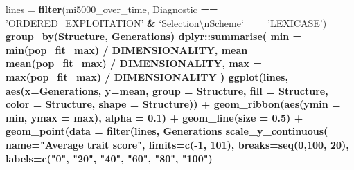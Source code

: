 \documentclass[]{book}
\newenvironment{Shaded}{\begin{snugshade}}{\end{snugshade}}
\newcommand{\CharTok}[1]{\textcolor[rgb]{0.31,0.60,0.02}{#1}}
\newcommand{\DataTypeTok}[1]{\textcolor[rgb]{0.13,0.29,0.53}{#1}}
\newcommand{\DecValTok}[1]{\textcolor[rgb]{0.00,0.00,0.81}{#1}}
\newcommand{\FloatTok}[1]{\textcolor[rgb]{0.00,0.00,0.81}{#1}}
\newcommand{\KeywordTok}[1]{\textcolor[rgb]{0.13,0.29,0.53}{\textbf{#1}}}
\newcommand{\NormalTok}[1]{#1}
\newcommand{\OperatorTok}[1]{\textcolor[rgb]{0.81,0.36,0.00}{\textbf{#1}}}
\newcommand{\StringTok}[1]{\textcolor[rgb]{0.31,0.60,0.02}{#1}}
\begin{document}
\begin{Shaded}
\begin{Highlighting}[]
\NormalTok{lines =}\StringTok{ }\KeywordTok{filter}\NormalTok{(mi5000_over_time, Diagnostic }\OperatorTok{==}\StringTok{ 'ORDERED_EXPLOITATION'} \OperatorTok{&}\StringTok{ `}\DataTypeTok{Selection}\CharTok{\textbackslash{}n}\DataTypeTok{Scheme}\StringTok{`} \OperatorTok{==}\StringTok{ 'LEXICASE'}\NormalTok{) }\OperatorTok{%>%}
\StringTok{  }\KeywordTok{group_by}\NormalTok{(Structure, Generations) }\OperatorTok{%>%}
\StringTok{  }\NormalTok{dplyr}\OperatorTok{::}\KeywordTok{summarise}\NormalTok{(}
    \DataTypeTok{min =} \KeywordTok{min}\NormalTok{(pop_fit_max) }\OperatorTok{/}\StringTok{ }\NormalTok{DIMENSIONALITY,}
    \DataTypeTok{mean =} \KeywordTok{mean}\NormalTok{(pop_fit_max) }\OperatorTok{/}\StringTok{ }\NormalTok{DIMENSIONALITY,}
    \DataTypeTok{max =} \KeywordTok{max}\NormalTok{(pop_fit_max) }\OperatorTok{/}\StringTok{ }\NormalTok{DIMENSIONALITY}
\NormalTok{  )}
\KeywordTok{ggplot}\NormalTok{(lines, }\KeywordTok{aes}\NormalTok{(}\DataTypeTok{x=}\NormalTok{Generations, }\DataTypeTok{y=}\NormalTok{mean, }\DataTypeTok{group =}\NormalTok{ Structure, }\DataTypeTok{fill =}\NormalTok{ Structure, }\DataTypeTok{color =}\NormalTok{ Structure, }\DataTypeTok{shape =}\NormalTok{ Structure)) }\OperatorTok{+}
\StringTok{  }\KeywordTok{geom_ribbon}\NormalTok{(}\KeywordTok{aes}\NormalTok{(}\DataTypeTok{ymin =}\NormalTok{ min, }\DataTypeTok{ymax =}\NormalTok{ max), }\DataTypeTok{alpha =} \FloatTok{0.1}\NormalTok{) }\OperatorTok{+}
\StringTok{  }\KeywordTok{geom_line}\NormalTok{(}\DataTypeTok{size =} \FloatTok{0.5}\NormalTok{) }\OperatorTok{+}
\StringTok{  }\KeywordTok{geom_point}\NormalTok{(}\DataTypeTok{data =} \KeywordTok{filter}\NormalTok{(lines, Generations }\OperatorTok{%%}\StringTok{ }\DecValTok{2000} \OperatorTok{==}\StringTok{ }\DecValTok{0}\NormalTok{), }\DataTypeTok{size =} \FloatTok{2.5}\NormalTok{, }\DataTypeTok{stroke =} \FloatTok{2.0}\NormalTok{, }\DataTypeTok{alpha =} \FloatTok{1.0}\NormalTok{) }\OperatorTok{+}
\StringTok{  }\KeywordTok{scale_y_continuous}\NormalTok{(}
    \DataTypeTok{name=}\StringTok{"Average trait score"}\NormalTok{,}
    \DataTypeTok{limits=}\KeywordTok{c}\NormalTok{(}\OperatorTok{-}\DecValTok{1}\NormalTok{, }\DecValTok{101}\NormalTok{),}
    \DataTypeTok{breaks=}\KeywordTok{seq}\NormalTok{(}\DecValTok{0}\NormalTok{,}\DecValTok{100}\NormalTok{, }\DecValTok{20}\NormalTok{),}
    \DataTypeTok{labels=}\KeywordTok{c}\NormalTok{(}\StringTok{"0"}\NormalTok{, }\StringTok{"20"}\NormalTok{, }\StringTok{"40"}\NormalTok{, }\StringTok{"60"}\NormalTok{, }\StringTok{"80"}\NormalTok{, }\StringTok{"100"}\NormalTok{)}
}}}
\end{Highlighting}
\end{Shaded}
\end{document}
